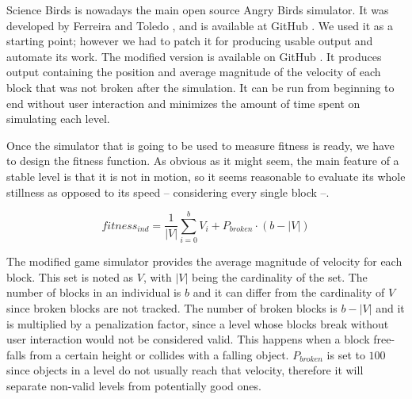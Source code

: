 \documentclass[sigconf]{acmart}
\begin{document}


Science Birds is nowadays the main open source Angry Birds simulator. It was developed by  Ferreira and Toledo \cite{ferreira2014search}, and is available at
GitHub \cite{sciencebirds}. We used it  as a starting point; however we
had to patch it for producing usable output 
and automate its work. The modified 
version is available on GitHub \cite{sciencebirds-adapt}. It produces output 
containing the position and average magnitude of the velocity of each block 
that was not broken after the simulation. It can be run from beginning to end 
without user interaction and minimizes the amount of time spent on simulating 
each level. 


Once the simulator that is going to be used to measure fitness is
ready, we have to design the fitness function. As obvious as it
might seem, the main feature of a stable level is that it 
is not in motion, so it seems reasonable to evaluate its whole stillness as opposed to its speed -- considering every single block --.

$$fitness_{ind} = \frac{1}{|V|}\sum_{i=0}^{b}{V_i} + P_{broken}\cdot(b-|V|)$$

The modified 
game simulator provides the average magnitude of
velocity for each block. %
This set is noted as $V$, with $|V|$ being the cardinality of the set. The number of blocks in an individual is $b$ and it can differ from the cardinality of $V$ since broken blocks are not tracked. The number of broken blocks is $b-|V|$ and it is multiplied by a penalization factor, since a level whose blocks break without user interaction would not be considered valid. This happens when a block free-falls from a certain height or collides with a falling object. 
$P_{broken}$ is set to $100$ since objects in a level do not usually reach that 
velocity, therefore it will separate non-valid levels from potentially good 
ones.
\end{document}
